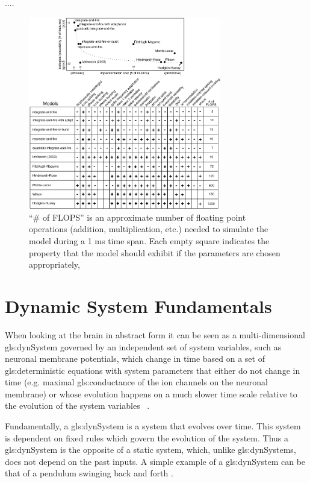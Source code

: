 \documentclass[../../Orator.tex]{subfiles}
\begin{document}
....


\begin{figure}[ht]
    \centering
    \includegraphics[width = 0.75\textwidth]{Pictures/Kenni/properties_spiking_bursting_models_all.png}
    \caption{“\# of FLOPS” is an approximate number of floating point operations (addition, multiplication, etc.) needed to simulate the model during a 1 ms time span. Each empty square indicates the property that the model should exhibit if the parameters are chosen appropriately, ~\cite{izhikevich2004model}}
    \label{fig:computational_properties}
\end{figure}






\section{Dynamic System Fundamentals}
When looking at the brain in abstract form it can be seen as a multi-dimensional \gls{gls:dynSystem} governed by an independent set of system variables, such as neuronal membrane potentials, which change in time based on a set of \gls{gls:deterministic} equations with system parameters that either do not change in time (e.g. maximal \gls{gls:conductance} of the ion
channels on the neuronal membrane) or whose evolution happens on a much slower time scale relative to the evolution of the system variables ~\cite{STEFANESCU2012748}.


Fundamentally, a \gls{gls:dynSystem} is a system that evolves over time. This system is dependent on fixed rules which govern the evolution of the system. Thus a \gls{gls:dynSystem} is the opposite of a static system, which, unlike \gls{gls:dynSystem}s, does not depend on the past inputs. A simple example of a \gls{gls:dynSystem} can be that of a pendulum swinging back and forth \cite{}. 
\end{document}
